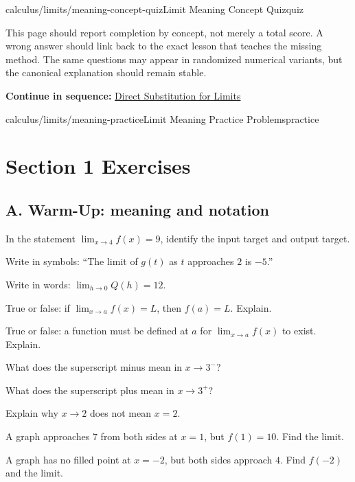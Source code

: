 \documentclass[11pt,openany]{book}
\theoremstyle{bgplain}
\newcommand{\webnext}[2]{%
  \par\addvspace{1.2em}\noindent{\color{BGLine}\rule{\textwidth}{0.35pt}}\par\smallskip
  {\small\color{BGGray}\textbf{Continue in sequence:} \hyperlink{web:#1}{#2}}\par
}
\begin{document}
\begin{webpage}{calculus/limits/meaning-concept-quiz}{Limit Meaning Concept Quiz}{quiz}
\begin{bgsummary}[title={Quiz use on the website}]
This page should report completion by concept, not merely a total score. A wrong answer should link back to the exact lesson that teaches the missing method. The same questions may appear in randomized numerical variants, but the canonical explanation should remain stable.
\end{bgsummary}
\webnext{calculus/limits/direct-substitution}{Direct Substitution for Limits}
\end{webpage}

\begin{webpage}{calculus/limits/meaning-practice}{Limit Meaning Practice Problems}{practice}
\section*{Section 1 Exercises}

\subsection*{A. Warm-Up: meaning and notation}

\begin{bgexercises}[label=\textbf{1.\arabic*}]
  \item In the statement \(\lim_{x\to4}f(x)=9\), identify the input target and output target.
  \item Write in symbols: ``The limit of \(g(t)\) as \(t\) approaches \(2\) is \(-5\).''
  \item Write in words: \(\lim_{h\to0}Q(h)=12\).
  \item True or false: if \(\lim_{x\to a}f(x)=L\), then \(f(a)=L\). Explain.
  \item True or false: a function must be defined at \(a\) for \(\lim_{x\to a}f(x)\) to exist. Explain.
  \item What does the superscript minus mean in \(x\to3^-\)?
  \item What does the superscript plus mean in \(x\to3^+\)?
  \item Explain why \(x\to2\) does not mean \(x=2\).
  \item A graph approaches \(7\) from both sides at \(x=1\), but \(f(1)=10\). Find the limit.
  \item A graph has no filled point at \(x=-2\), but both sides approach \(4\). Find \(f(-2)\) and the limit.
\end{bgexercises}


\end{webpage}
\end{document}
